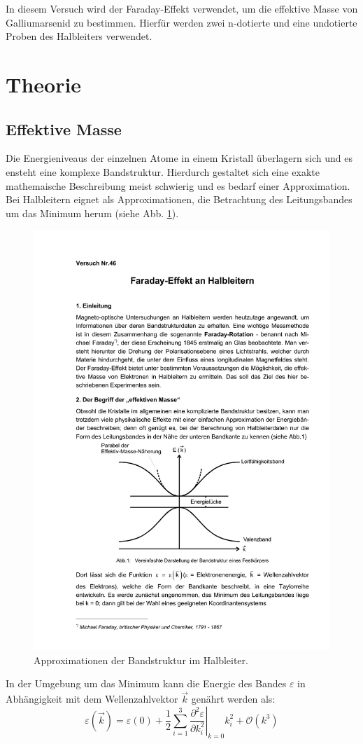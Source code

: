 In diesem Versuch wird der Faraday-Effekt verwendet, um die effektive Masse von
Galliumarsenid zu bestimmen. Hierfür werden zwei n-dotierte und eine undotierte
Proben des Halbleiters verwendet.

\section{Theorie}
\label{sec:Theorie}

\subsection{Effektive Masse}\label{sec:effektive_masse}
Die Energieniveaus der einzelnen Atome in einem Kristall überlagern sich und es ensteht eine komplexe Bandstruktur.
Hierdurch gestaltet sich eine exakte mathemaische Beschreibung meist schwierig und es bedarf
einer Approximation.
Bei Halbleitern eignet als Approximationen, die Betrachtung des Leitungsbandes um das Minimum herum (siehe Abb. \ref{fig:band}).
\begin{figure}
\centering
\includegraphics[width=0.5\linewidth]{./content/images/band.pdf}
\caption{Approximationen der Bandstruktur im Halbleiter.}
\label{fig:band}
\end{figure}
In der Umgebung um das Minimum kann die Energie des Bandes $\varepsilon$
in Abhängigkeit mit dem Wellenzahlvektor $\vec{k}$ genährt werden als:
\begin{equation}
  \label{eq:gleichung_energie}
  \varepsilon(\vec{k})=\varepsilon(0) + \frac{1}{2}\sum_{i=1}^3 \left.\frac{\partial^2 \varepsilon}{\partial k_i^2}\right|_{k=0}k_i^2 + \mathcal{O}(k^3)
\end{equation}
